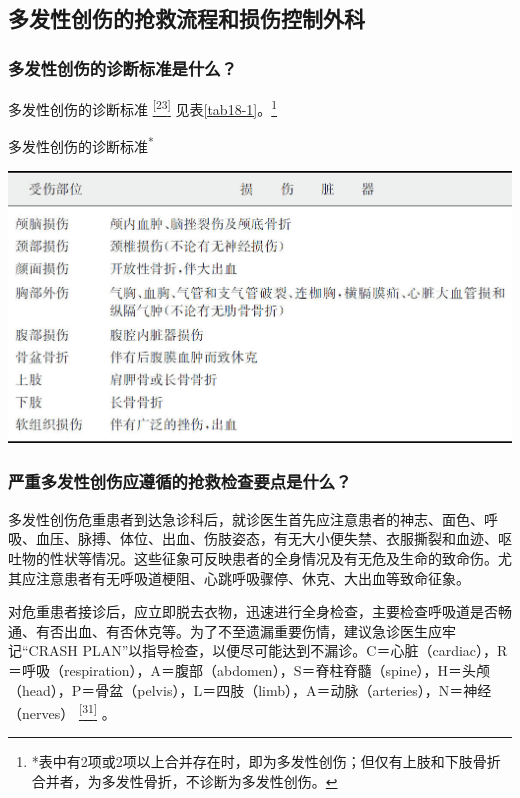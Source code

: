 \subsection{多发性创伤的抢救流程和损伤控制外科}

\subsubsection{多发性创伤的诊断标准是什么？}

多发性创伤的诊断标准
\protect\hyperlink{text00024.htmlux5cux23ch23-23}{\textsuperscript{{[}23{]}}}
见表\ref{tab18-1}。\footnote{*表中有2项或2项以上合并存在时，即为多发性创伤；但仅有上肢和下肢骨折合并者，为多发性骨折，不诊断为多发性创伤。}

\begin{table}[htbp]
\centering
\caption{多发性创伤的诊断标准\textsuperscript{*}}
\label{tab18-1}
\includegraphics{./images/Image00141.jpg}
\end{table}

\subsubsection{严重多发性创伤应遵循的抢救检查要点是什么？}

多发性创伤危重患者到达急诊科后，就诊医生首先应注意患者的神志、面色、呼吸、血压、脉搏、体位、出血、伤肢姿态，有无大小便失禁、衣服撕裂和血迹、呕吐物的性状等情况。这些征象可反映患者的全身情况及有无危及生命的致命伤。尤其应注意患者有无呼吸道梗阻、心跳呼吸骤停、休克、大出血等致命征象。

对危重患者接诊后，应立即脱去衣物，迅速进行全身检查，主要检查呼吸道是否畅通、有否出血、有否休克等。为了不至遗漏重要伤情，建议急诊医生应牢记“CRASH
PLAN”以指导检查，以便尽可能达到不漏诊。C＝心脏（cardiac），R＝呼吸（respiration），A＝腹部（abdomen），S＝脊柱脊髓（spine），H＝头颅（head），P＝骨盆（pelvis），L＝四肢（limb），A＝动脉（arteries），N＝神经（nerves）
\protect\hyperlink{text00024.htmlux5cux23ch31-23}{\textsuperscript{{[}31{]}}}
。

